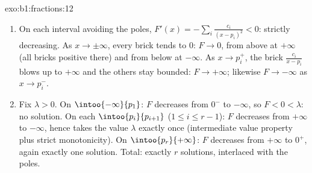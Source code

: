 \begin{solution}{exo:b1:fractions:12}
\begin{enumerate}
  \item On each interval avoiding the poles, $F'(x) = -\sum_i
        \frac{c_i}{(x - p_i)^2} < 0$: strictly decreasing. As $x
        \to \pm\infty$, every brick tends to $0$: $F \to 0$, from
        above at $+\infty$ (all bricks positive there) and from
        below at $-\infty$. As $x \to p_i^+$, the brick
        $\frac{c_i}{x - p_i}$ blows up to $+\infty$ and the others
        stay bounded: $F \to +\infty$; likewise $F \to -\infty$ as
        $x \to p_i^-$.
  \item Fix $\lambda > 0$. On $\intoo{-\infty}{p_1}$: $F$
        decreases from $0^-$ to $-\infty$, so $F < 0 < \lambda$:
        no solution. On each $\intoo{p_i}{p_{i+1}}$ ($1 \leq i
        \leq r-1$): $F$ decreases from $+\infty$ to $-\infty$,
        hence takes the value $\lambda$ exactly once (intermediate
        value property plus strict monotonicity). On
        $\intoo{p_r}{+\infty}$: $F$ decreases from $+\infty$ to
        $0^+$, again exactly one solution. Total: exactly $r$
        solutions, interlaced with the poles.
\end{enumerate}
\end{solution}

